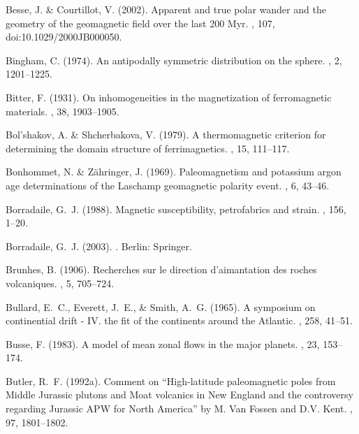 \documentclass[11pt]{book}
\begin{document}
\begin{thebibliography}{}
Besse, J. \& Courtillot, V. (2002).
\newblock Apparent and true polar wander and the geometry of the geomagnetic
  field over the last 200 Myr.
, 107, doi:10.1029/2000JB000050.

Bingham, C. (1974).
\newblock An antipodally symmetric distribution on the sphere.
, 2, 1201--1225.

Bitter, F. (1931).
\newblock On inhomogeneities in the magnetization of ferromagnetic materials.
, 38, 1903--1905.

Bol'shakov, A. \& Shcherbakova, V. (1979).
\newblock A thermomagnetic criterion for determining the domain structure of
  ferrimagnetics.
, 15, 111--117.

Bonhommet, N. \& Z\"ahringer, J. (1969).
\newblock Paleomagnetism and potassium argon age determinations of the Laschamp
  geomagnetic polarity event.
, 6, 43--46.

Borradaile, G.~J. (1988).
\newblock Magnetic susceptibility, petrofabrics and strain.
, 156, 1--20.

Borradaile, G.~J. (2003).
.
\newblock Berlin: Springer.

Brunhes, B. (1906).
\newblock Recherches sur le direction d'aimantation des roches volcaniques.
, 5, 705--724.

Bullard, E.~C., Everett, J.~E., \& Smith, A.~G. (1965).
\newblock A symposium on continential drift - IV. the fit of the continents
  around the Atlantic.
, 258, 41--51.

Busse, F. (1983).
\newblock A model of mean zonal flows in the major planets.
, 23, 153--174.

Butler, R.~F. (1992a).
\newblock Comment on ``High-latitude paleomagnetic poles from Middle Jurassic
  plutons and Moat volcanics in New England and the controversy regarding
  Jurassic {APW} for North America'' by {M}. Van Fossen and {D}.{V}. Kent.
, 97, 1801--1802.


\end{thebibliography}
\end{document}
